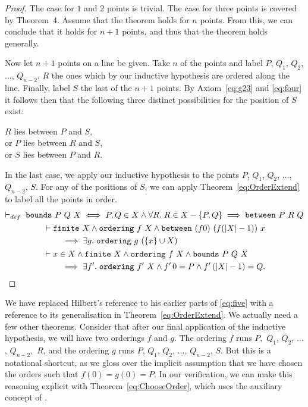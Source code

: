 \begin{proof}
The case for $1$ and $2$ points is trivial. The case for three points is covered by Theorem~4. Assume that the theorem holds for $n$ points. From this, we can conclude that it holds for $n+1$ points, and thus that the theorem holds generally.

Now let $n+1$ points on a line be given. Take $n$ of the points and label $P$, $Q_1$, $Q_2$, $\ldots$, $Q_{n-2}$, $R$ the ones which by our inductive hypothesis are ordered along the line. Finally, label $S$ the last of the $n+1$ points. By Axiom~\ref{eq:g23} and \ref{eq:four} it follows then that the following three distinct possibilities for the position of $S$ exist:

\vspace{0.5cm}
\noindent $R$ lies between $P$ and $S$,\\
\noindent or $P$ lies between $R$ and $S$,\\
\noindent or $S$ lies between $P$ and $R$.
\vspace{0.5cm}

In the last case, we apply our inductive hypothesis to the points $P$, $Q_1$, $Q_2$, $\ldots$, $Q_{n-2}$, $S$. For any of the positions of $S$, we can apply Theorem~\ref{eq:OrderExtend} to label all the points in order.
\begin{gather}
  \vdash_{def}\; \code{bounds}\ P\ Q\ X \iff P,Q \in X \wedge \forall R.\; R \in X - \{P,Q\} \implies \between{P}{R}{Q}\notag\\
  \begin{aligned}  \label{eq:OrderExtend}
    &\vdash\code{finite}\ X \wedge \code{ordering}\ f\ X \wedge \between{(f 0)}{(f (|X| - 1))}{x}\\
    &\qquad \implies \exists g.\; \code{ordering}\ g\ (\{x\} \cup X)
  \end{aligned}\\
  \begin{aligned}  \label{eq:ChooseOrder}
    &\vdash x \in X \wedge \code{finite}\ X \wedge \code{ordering}\ f\ X \wedge \code{bounds}\ P\ Q\ X\\
    &\qquad\implies\exists f'.\; \code{ordering}\ f'\ X \wedge f'\,0 = P \wedge f'\,(|X| - 1) = Q.
  \end{aligned}
\end{gather}

\end{proof}
We have replaced Hilbert's reference to his earlier parts of \ref{eq:five} with a reference to its generalisation in Theorem~\ref{eq:OrderExtend}. We actually need a few other theorems. Consider that after our final application of the inductive hypothesis, we will have two orderings $f$ and $g$. The ordering $f$ runs $P,$ $Q_1$, $Q_2$, $\ldots$, $Q_{n-2},$ $R$, and the ordering $g$ runs $P$, $Q_1$, $Q_2$, $\ldots$, $Q_{n-2}$, $S$. But this is a notational shortcut, as we gloss over the implicit assumption that we have chosen the orders such that $f(0) = g(0) = P$. In our verification, we can make this reasoning explicit with Theorem~\ref{eq:ChooseOrder}, which uses the auxiliary concept of . 

